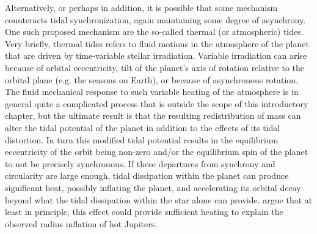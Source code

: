 Alternatively, or perhaps in addition, it is possible that some mechanism
counteracts tidal synchronization, again maintaining some degree of asynchrony.
One such proposed mechanism are the so-called thermal (or atmospheric) tides.
Very briefly, thermal tides refers to fluid motions in the atmosphere of the
planet that are driven by time-variable stellar irradiation. Variable
irradiation can arise because of orbital eccentricity, tilt of the planet's axis
of rotation relative to the orbital plane (e.g. the seasons on Earth), or
because of asynchronous rotation. The fluid mechanical response to such variable
heating of the atmosphere is in general quite a complicated process that is
outside the scope of this introductory chapter, but the ultimate result is that
the resulting redistribution of mass can alter the tidal potential of the planet
in addition to the effects of its tidal distortion. In turn this modified tidal
potential results in the equilibrium eccentricity of the orbit being non-zero
and/or the equilibrium spin of the planet to not be precisely synchronous. If
these departures from synchrony and circularity are large enough, tidal
dissipation within the planet can produce significant heat, possibly inflating
the planet, and accelerating its orbital decay beyond what the tidal dissipation
within the star alone can provide. \citet{Arras_Socrates_10} argue that at
least in principle, this effect could provide sufficient heating to explain the
observed radius inflation of hot Jupiters.
